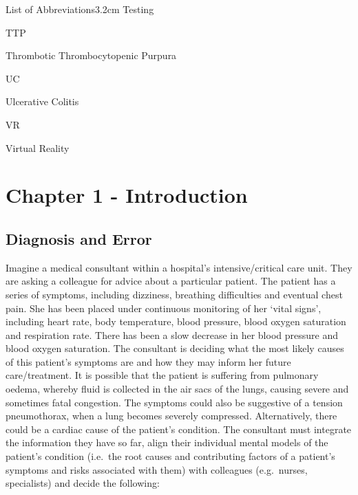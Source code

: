 \documentclass[a4paper, nobind]{templates/ociamthesis}
\begin{document}
\begin{romanpages}
\begin{mclistof}{List of Abbreviations}{3.2cm}
Testing

\item[TTP]

Thrombotic Thrombocytopenic Purpura

\item[UC]

Ulcerative Colitis

\item[VR]

Virtual Reality

\end{mclistof} 


\end{romanpages}

\flushbottom

\chapter*{Chapter 1 - Introduction}\label{chapter-1---introduction}

\adjustmtc
{}

\section*{Diagnosis and Error}\label{diagnosis-and-error}

Imagine a medical consultant within a hospital's intensive/critical care unit. They are asking a colleague for advice about a particular patient. The patient has a series of symptoms, including dizziness, breathing difficulties and eventual chest pain. She has been placed under continuous monitoring of her `vital signs', including heart rate, body temperature, blood pressure, blood oxygen saturation and respiration rate. There has been a slow decrease in her blood pressure and blood oxygen saturation. The consultant is deciding what the most likely causes of this patient's symptoms are and how they may inform her future care/treatment. It is possible that the patient is suffering from pulmonary oedema, whereby fluid is collected in the air sacs of the lungs, causing severe and sometimes fatal congestion. The symptoms could also be suggestive of a tension pneumothorax, when a lung becomes severely compressed. Alternatively, there could be a cardiac cause of the patient's condition. The consultant must integrate the information they have so far, align their individual mental models of the patient's condition (i.e.~the root causes and contributing factors of a patient's symptoms and risks associated with them) with colleagues (e.g.~nurses, specialists) and decide the following:
\end{document}
